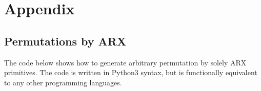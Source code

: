 
\newpage

\section*{Appendix}

\renewcommand\thesubsection{\Alph{subsection}}

\subsection{Permutations by ARX}
\label{ssec:permarx}

The code below shows how to generate arbitrary permutation by solely ARX primitives.
The code is written in Python3 syntax, but is functionally equivalent to any other
programming languages.

\begin{figure}[h!]

\vspace{-5mm}
\end{figure}



%
